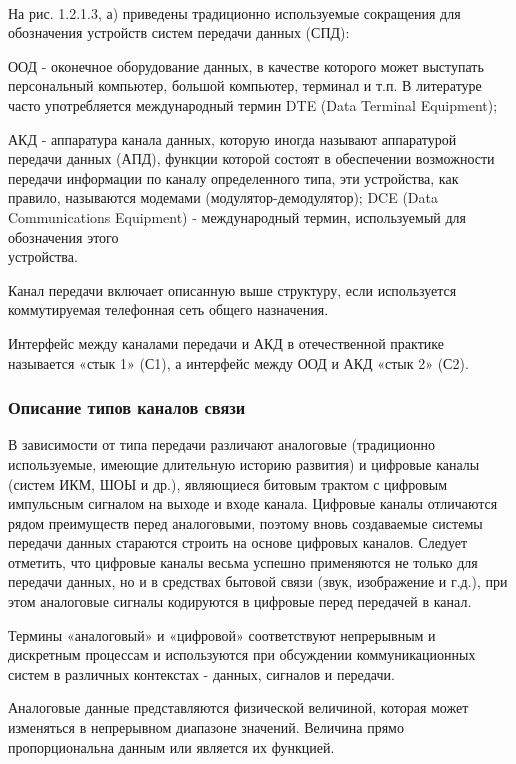 \documentclass[a4paper]{report}
\begin{document}
~

На рис. 1.2.1.3, а) приведены традиционно используемые сокращения для обозначения устройств систем передачи данных (СПД):

ООД - оконечное оборудование данных, в качестве которого может выступать персональный компьютер, большой компьютер, терминал и т.п. В литературе часто употребляется международный термин DTE (Data Terminal Equipment);

АКД - аппаратура канала данных, которую иногда называют аппаратурой передачи данных (АПД), функции которой состоят в обеспечении возможности передачи информации по каналу определенного типа, эти устройства, как правило, называются модемами (модулятор-демодулятор); DCE (Data Communications Equipment) - международный термин, используемый для обозначения этого \\ устройства.

Канал передачи включает описанную выше структуру, если используется коммутируемая телефонная сеть общего назначения.

Интерфейс между каналами передачи и АКД в отечественной практике называется «стык 1» (С1), а интерфейс между ООД и АКД «стык 2» (С2).

\subsubsection{Описание типов каналов связи}

В зависимости от типа передачи различают аналоговые (традиционно используемые, имеющие длительную историю развития) и цифровые каналы (систем ИКМ, ШОЫ и др.), являющиеся битовым трактом с цифровым импульсным сигналом на выходе и входе канала. Цифровые каналы отличаются рядом преимуществ перед аналоговыми, поэтому вновь создаваемые системы передачи данных стараются строить на основе цифровых каналов. Следует отметить, что цифровые каналы весьма успешно применяются не только для передачи данных, но и в средствах бытовой связи (звук, изображение и г.д.), при этом аналоговые сигналы кодируются в цифровые перед передачей в канал.

Термины «аналоговый» и «цифровой» соответствуют непрерывным и дискретным процессам и используются при обсуждении коммуникационных систем в различных контекстах - данных, сигналов и передачи.

Аналоговые данные представляются физической величиной, которая может изменяться в непрерывном диапазоне значений. Величина прямо пропорциональна данным или является их функцией.
\end{document}
